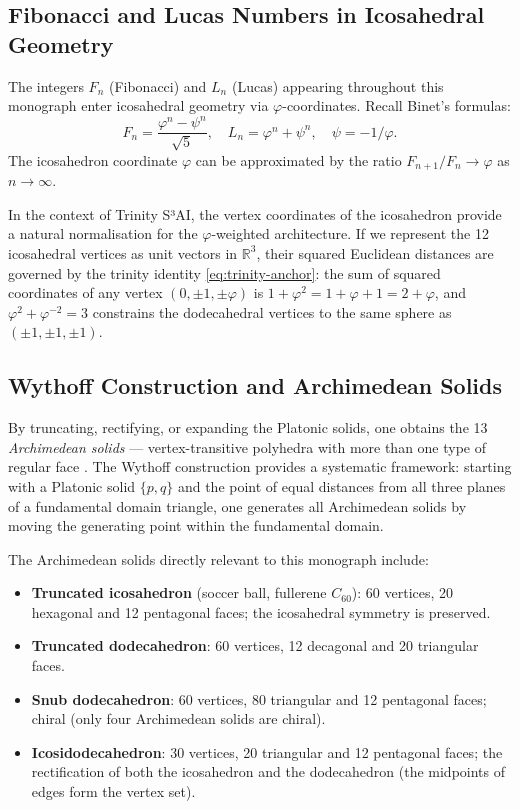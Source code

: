 \subsection{Fibonacci and Lucas Numbers in Icosahedral Geometry}
\label{sec:fib-lucas-icosa}

The integers $F_n$ (Fibonacci) and $L_n$ (Lucas) appearing throughout this
monograph enter icosahedral geometry via $\varphi$-coordinates.  Recall
Binet's formulas:
\[
  F_n = \frac{\varphi^n - \psi^n}{\sqrt{5}}, \quad
  L_n = \varphi^n + \psi^n, \quad \psi = -1/\varphi.
\]
The icosahedron coordinate $\varphi$ can be approximated by the ratio $F_{n+1}/F_n \to \varphi$ as $n \to \infty$.

In the context of Trinity S³AI, the vertex coordinates of the icosahedron provide
a natural normalisation for the $\varphi$-weighted architecture.  If we
represent the 12 icosahedral vertices as unit vectors in $\mathbb{R}^3$, their
squared Euclidean distances are governed by the trinity identity
\eqref{eq:trinity-anchor}: the sum of squared coordinates of any vertex
$(0,\pm 1,\pm\varphi)$ is $1 + \varphi^2 = 1 + \varphi + 1 = 2 + \varphi$, and
$\varphi^2 + \varphi^{-2} = 3$ constrains the dodecahedral vertices to the
same sphere as $(\pm 1,\pm 1,\pm 1)$.

\subsection{Wythoff Construction and Archimedean Solids}
\label{sec:wythoff}

By truncating, rectifying, or expanding the Platonic solids, one obtains the
13 \emph{Archimedean solids} — vertex-transitive polyhedra with more than one
type of regular face \cite{cromwell_polyhedra}.  The Wythoff construction provides a
systematic framework: starting with a Platonic solid $\{p,q\}$ and the point
of equal distances from all three planes of a fundamental domain triangle,
one generates all Archimedean solids by moving the generating point within
the fundamental domain.

The Archimedean solids directly relevant to this monograph include:
\begin{itemize}
  \item \textbf{Truncated icosahedron} (soccer ball, fullerene $C_{60}$): 60
        vertices, 20 hexagonal and 12 pentagonal faces; the icosahedral
        symmetry is preserved.
  \item \textbf{Truncated dodecahedron}: 60 vertices, 12 decagonal and 20
        triangular faces.
  \item \textbf{Snub dodecahedron}: 60 vertices, 80 triangular and 12
        pentagonal faces; chiral (only four Archimedean solids are chiral).
  \item \textbf{Icosidodecahedron}: 30 vertices, 20 triangular and 12
        pentagonal faces; the rectification of both the icosahedron and the
        dodecahedron (the midpoints of edges form the vertex set).
\end{itemize}

